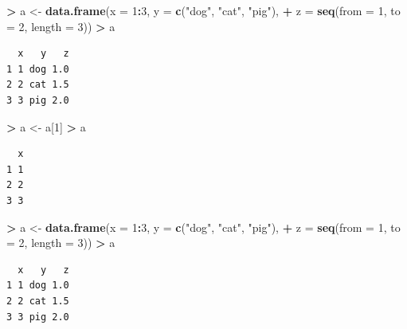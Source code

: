 \documentclass[]{krantz}
\makeatletter
\newenvironment{Shaded}{\begin{snugshade}}{\end{snugshade}}
\newcommand{\KeywordTok}[1]{\textcolor[rgb]{0.27,0.27,0.27}{\textbf{#1}}}
\newcommand{\DataTypeTok}[1]{\textcolor[rgb]{0.27,0.27,0.27}{#1}}
\newcommand{\DecValTok}[1]{\textcolor[rgb]{0.06,0.06,0.06}{#1}}
\newcommand{\StringTok}[1]{\textcolor[rgb]{0.5,0.5,0.5}{#1}}
\newcommand{\OperatorTok}[1]{\textcolor[rgb]{0.43,0.43,0.43}{\textbf{#1}}}
\newcommand{\NormalTok}[1]{#1}
\newenvironment{kframe}{%
\medskip{}
\setlength{\fboxsep}{.8em}
 \def\at@end@of@kframe{}%
 \ifinner\ifhmode%
  \def\at@end@of@kframe{\end{minipage}}%
  \begin{minipage}{\columnwidth}%
 \fi\fi%
 \def\FrameCommand##1{\hskip\@totalleftmargin \hskip-\fboxsep
 \colorbox{shadecolor}{##1}\hskip-\fboxsep
     \hskip-\linewidth \hskip-\@totalleftmargin \hskip\columnwidth}%
 \MakeFramed {\advance\hsize-\width
   \@totalleftmargin\z@ \linewidth\hsize
   \@setminipage}}%
 {\par\unskip\endMakeFramed%
 \at@end@of@kframe}
\renewenvironment{Shaded}{\begin{kframe}}{\end{kframe}}
\makeatother
\begin{document}
\begin{Shaded}
\begin{Highlighting}[]
\OperatorTok{>}\StringTok{ }\NormalTok{a <-}\StringTok{ }\KeywordTok{data.frame}\NormalTok{(}\DataTypeTok{x =} \DecValTok{1}\OperatorTok{:}\DecValTok{3}\NormalTok{, }\DataTypeTok{y =} \KeywordTok{c}\NormalTok{(}\StringTok{"dog"}\NormalTok{, }\StringTok{"cat"}\NormalTok{, }\StringTok{"pig"}\NormalTok{), }
\OperatorTok{+}\StringTok{                 }\DataTypeTok{z =} \KeywordTok{seq}\NormalTok{(}\DataTypeTok{from =} \DecValTok{1}\NormalTok{, }\DataTypeTok{to =} \DecValTok{2}\NormalTok{, }\DataTypeTok{length =} \DecValTok{3}\NormalTok{))}
\OperatorTok{>}\StringTok{ }\NormalTok{a}
\end{Highlighting}
\end{Shaded}

\begin{verbatim}
  x   y   z
1 1 dog 1.0
2 2 cat 1.5
3 3 pig 2.0
\end{verbatim}

\begin{Shaded}
\begin{Highlighting}[]
\OperatorTok{>}\StringTok{ }\NormalTok{a <-}\StringTok{ }\NormalTok{a[}\DecValTok{1}\NormalTok{]}
\OperatorTok{>}\StringTok{ }\NormalTok{a }
\end{Highlighting}
\end{Shaded}

\begin{verbatim}
  x
1 1
2 2
3 3
\end{verbatim}

\begin{Shaded}
\begin{Highlighting}[]
\OperatorTok{>}\StringTok{ }\NormalTok{a <-}\StringTok{ }\KeywordTok{data.frame}\NormalTok{(}\DataTypeTok{x =} \DecValTok{1}\OperatorTok{:}\DecValTok{3}\NormalTok{, }\DataTypeTok{y =} \KeywordTok{c}\NormalTok{(}\StringTok{"dog"}\NormalTok{, }\StringTok{"cat"}\NormalTok{, }\StringTok{"pig"}\NormalTok{), }
\OperatorTok{+}\StringTok{                 }\DataTypeTok{z =} \KeywordTok{seq}\NormalTok{(}\DataTypeTok{from =} \DecValTok{1}\NormalTok{, }\DataTypeTok{to =} \DecValTok{2}\NormalTok{, }\DataTypeTok{length =} \DecValTok{3}\NormalTok{))}
\OperatorTok{>}\StringTok{ }\NormalTok{a }
\end{Highlighting}
\end{Shaded}

\begin{verbatim}
  x   y   z
1 1 dog 1.0
2 2 cat 1.5
3 3 pig 2.0
\end{verbatim}
\end{document}
